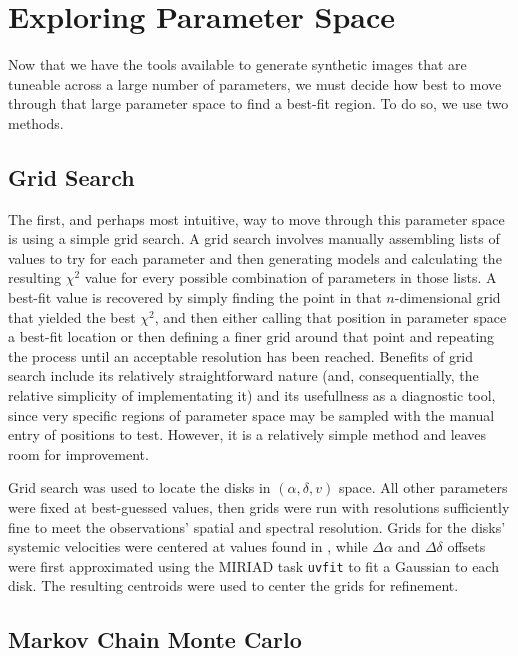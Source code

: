 \section{Exploring Parameter Space}
\label{section:param_space}

Now that we have the tools available to generate synthetic images that are tuneable across a large number of parameters, we must decide how best to move through that large parameter space to find a best-fit region. To do so, we use two methods.

\subsection{Grid Search}
\label{subsection:grid_search}
The first, and perhaps most intuitive, way to move through this parameter space is using a simple grid search. A grid search involves manually assembling lists of values to try for each parameter and then generating models and calculating the resulting $\chi^2$ value for every possible combination of parameters in those lists. A best-fit value is recovered by simply finding the point in that $n$-dimensional grid that yielded the best $\chi^2$, and then either calling that position in parameter space a best-fit location or then defining a finer grid around that point and repeating the process until an acceptable resolution has been reached. Benefits of grid search include its relatively straightforward nature (and, consequentially, the relative simplicity of implementating it) and its usefullness as a diagnostic tool, since very specific regions of parameter space may be sampled with the manual entry of positions to test. However, it is a relatively simple method and leaves room for improvement.

Grid search was used to locate the disks in $(\alpha, \delta, v)$ space. All other parameters were fixed at best-guessed values, then grids were run with resolutions sufficiently fine to meet the observations' spatial and spectral resolution. Grids for the disks' systemic velocities were centered at values found in \citet{Williams2014}, while $\Delta \alpha$ and $\Delta \delta$ offsets were first approximated using the MIRIAD task \texttt{uvfit} to fit a Gaussian to each disk. The resulting centroids were used to center the grids for refinement.


\subsection{Markov Chain Monte Carlo}
\label{subsection:mcmc}

